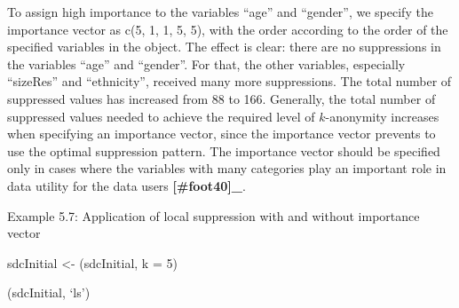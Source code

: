 \documentclass[letterpaper,10pt,english]{sphinxmanual}
\begin{document}
To assign high importance to the variables “age” and “gender”, we
specify the importance vector as c(5, 1, 1, 5, 5), with the order
according to the order of the specified variables in the 
object. The effect is clear: there are no suppressions in the variables
“age” and “gender”. For that, the other variables, especially “sizeRes”
and “ethnicity”, received many more suppressions. The total number of
suppressed values has increased from 88 to 166.   Generally, the
total number of suppressed values needed to achieve the required level
of \(k\)-anonymity increases when specifying an importance vector,
since the importance vector prevents to use the optimal suppression
pattern. The importance vector should be specified only in cases where
the variables with many categories play an important role in data
utility for the data users {\color{red}\bfseries{}{[}\#foot40{]}\_}.

Example 5.7: Application of local suppression with and without
importance vector


sdcInitial \textless{}- (sdcInitial, k = 5)

(sdcInitial, ‘ls’)

\begin{DUlineblock}{0em}
\item[] 
\item[] 
\item[] 
\item[] 
\item[] 
\item[] 
\end{DUlineblock}
\end{document}
